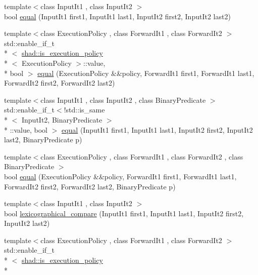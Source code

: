 \begin{DoxyCompactItemize}
\item 
{\footnotesize template$<$class Input\-It1 , class Input\-It2 $>$ }\\bool \hyperlink{namespaceshad_aa5dcd90777a8948f8cb240d51bd1346b}{equal} (Input\-It1 first1, Input\-It1 last1, Input\-It2 first2, Input\-It2 last2)
\item 
{\footnotesize template$<$class Execution\-Policy , class Forward\-It1 , class Forward\-It2 $>$ }\\std\-::enable\-\_\-if\-\_\-t\\*
$<$ \hyperlink{structshad_1_1is__execution__policy}{shad\-::is\-\_\-execution\-\_\-policy}\\*
$<$ Execution\-Policy $>$\-::value, \\*
bool $>$ \hyperlink{namespaceshad_ae452511628cb333e23458bb2af8cfa83}{equal} (Execution\-Policy \&\&policy, Forward\-It1 first1, Forward\-It1 last1, Forward\-It2 first2, Forward\-It2 last2)
\item 
{\footnotesize template$<$class Input\-It1 , class Input\-It2 , class Binary\-Predicate $>$ }\\std\-::enable\-\_\-if\-\_\-t$<$!std\-::is\-\_\-same\\*
$<$ Input\-It2, Binary\-Predicate $>$\\*
\-::value, bool $>$ \hyperlink{namespaceshad_a729216b8f76b721c9e1ae8fdcb63ee03}{equal} (Input\-It1 first1, Input\-It1 last1, Input\-It2 first2, Input\-It2 last2, Binary\-Predicate p)
\item 
{\footnotesize template$<$class Execution\-Policy , class Forward\-It1 , class Forward\-It2 , class Binary\-Predicate $>$ }\\bool \hyperlink{namespaceshad_a8566c24e54c82d15757af3f776c54c40}{equal} (Execution\-Policy \&\&policy, Forward\-It1 first1, Forward\-It1 last1, Forward\-It2 first2, Forward\-It2 last2, Binary\-Predicate p)
\item 
{\footnotesize template$<$class Input\-It1 , class Input\-It2 $>$ }\\bool \hyperlink{namespaceshad_a65aac88682894c75b4b1caee38cc9c8f}{lexicographical\-\_\-compare} (Input\-It1 first1, Input\-It1 last1, Input\-It2 first2, Input\-It2 last2)
\item 
{\footnotesize template$<$class Execution\-Policy , class Forward\-It1 , class Forward\-It2 $>$ }\\std\-::enable\-\_\-if\-\_\-t\\*
$<$ \hyperlink{structshad_1_1is__execution__policy}{shad\-::is\-\_\-execution\-\_\-policy}\\*

\end{DoxyCompactItemize}
